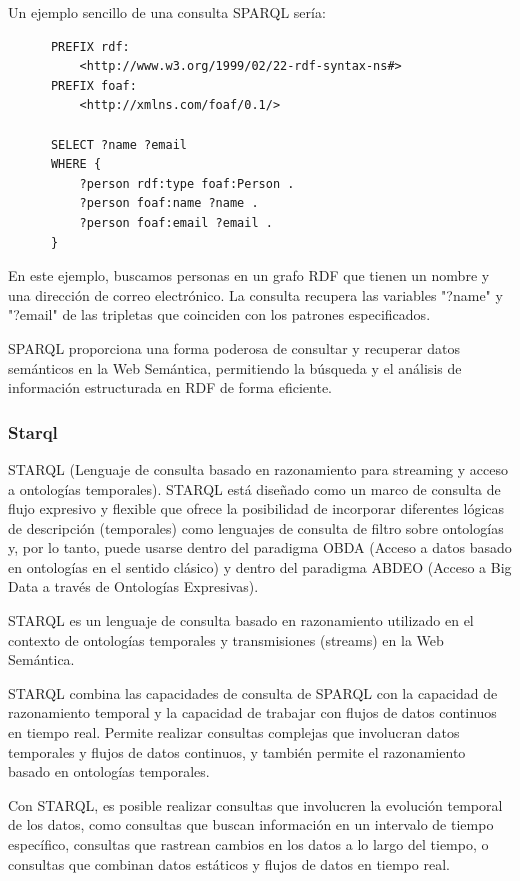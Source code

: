 \documentclass[12pt]{article}
\begin{document}
Un ejemplo sencillo de una consulta SPARQL sería:

\begin{lstlisting}
      PREFIX rdf:
          <http://www.w3.org/1999/02/22-rdf-syntax-ns#>
      PREFIX foaf:
          <http://xmlns.com/foaf/0.1/>

      SELECT ?name ?email
      WHERE {
          ?person rdf:type foaf:Person .
          ?person foaf:name ?name .
          ?person foaf:email ?email .
      }
\end{lstlisting}

En este ejemplo, buscamos personas en un grafo RDF que tienen un nombre y una dirección de correo electrónico. La consulta recupera las variables "?name" y "?email" de las tripletas que coinciden con los patrones especificados.

SPARQL proporciona una forma poderosa de consultar y recuperar datos semánticos en la Web Semántica, permitiendo la búsqueda y el análisis de información estructurada en RDF de forma eficiente.


\subsubsection{Starql}
STARQL (Lenguaje de consulta basado en razonamiento para streaming y acceso a ontologías temporales). STARQL está diseñado como un marco de consulta de flujo expresivo y flexible que ofrece la posibilidad de incorporar diferentes lógicas de descripción (temporales) como lenguajes de consulta de filtro sobre ontologías y, por lo tanto, puede usarse dentro del paradigma OBDA (Acceso a datos basado en ontologías en el sentido clásico) y dentro del paradigma ABDEO (Acceso a Big Data a través de Ontologías Expresivas). \citep{ref47}

STARQL es un lenguaje de consulta basado en razonamiento utilizado en el contexto de ontologías temporales y transmisiones (streams) en la Web Semántica.

STARQL combina las capacidades de consulta de SPARQL con la capacidad de razonamiento temporal y la capacidad de trabajar con flujos de datos continuos en tiempo real. Permite realizar consultas complejas que involucran datos temporales y flujos de datos continuos, y también permite el razonamiento basado en ontologías temporales.

Con STARQL, es posible realizar consultas que involucren la evolución temporal de los datos, como consultas que buscan información en un intervalo de tiempo específico, consultas que rastrean cambios en los datos a lo largo del tiempo, o consultas que combinan datos estáticos y flujos de datos en tiempo real.
\end{document}
